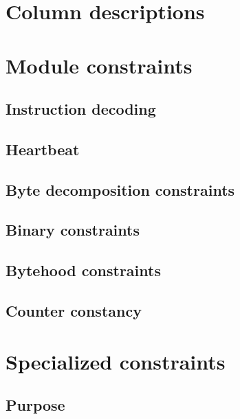 

\section{Column descriptions} 

\section{Module constraints}
\subsection{Instruction decoding}			\label{mmio: instruction decoding}			  
\subsection{Heartbeat}                      \label{mmio: heartbeat}         			  
\subsection{Byte decomposition constraints}                                 			  
\subsection{Binary constraints}    			\label{mmio: specialized constraints: binary} 
\subsection{Bytehood constraints}                                           			  
\subsection{Counter constancy}              \label{mmio: counter constancy} 			  

\section{Specialized constraints} \label{mmio: specialized constraints}
\subsection{Purpose}              \label{mmio: specialized constraints: purpose}             
